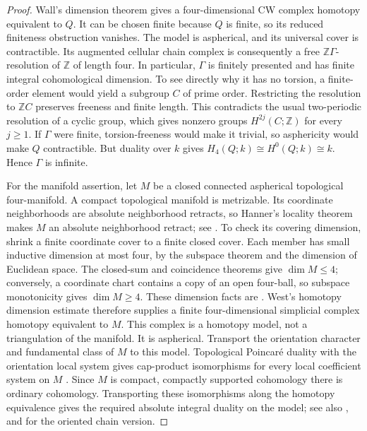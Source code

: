\begin{proof}
Wall's dimension theorem \cite[Theorem~2.2]{Wall1967} gives a
four-dimensional CW complex homotopy equivalent to $Q$. It can be
chosen finite because $Q$ is finite, so its reduced finiteness
obstruction vanishes. The model is aspherical, and its universal
cover is contractible. Its augmented cellular chain complex is
consequently a free $\mathbb Z\Gamma$-resolution of $\mathbb Z$ of
length four.
In particular, $\Gamma$ is finitely presented and has finite integral
cohomological dimension. To see directly why it has no torsion, a
finite-order element would yield a subgroup $C$ of prime order.
Restricting the resolution to $\mathbb Z C$ preserves freeness and
finite length. This contradicts the usual two-periodic resolution of
a cyclic group, which gives nonzero groups $H^{2j}(C;\mathbb Z)$ for
every $j\geq1$.
If $\Gamma$ were finite, torsion-freeness would make it trivial, so
asphericity would make $Q$ contractible. But duality over $k$ gives
$H_4(Q;k)\cong H^0(Q;k)\cong k$. Hence $\Gamma$ is infinite.

For the manifold assertion, let $M$ be a closed connected aspherical
topological four-manifold.
A compact topological manifold is metrizable. Its coordinate neighborhoods
are absolute neighborhood retracts, so Hanner's locality theorem makes
$M$ an absolute neighborhood retract; see
\cite[Theorems~3.2--3.3]{Hanner1951}.
To check its covering dimension, shrink a finite coordinate cover to a
finite closed cover. Each member has small inductive dimension at most
four, by the subspace theorem and the dimension of Euclidean space.
The closed-sum and coincidence theorems give $\dim M\le4$; conversely,
a coordinate chart contains a copy of an open four-ball, so subspace
monotonicity gives $\dim M\ge4$. These dimension facts are
\cite[Theorems~1.1.2, 1.5.3, 1.7.7 and~1.8.2]{Engelking1978}.
West's homotopy dimension estimate
\cite[Corollary~5.4]{West1977} therefore supplies a finite
four-dimensional simplicial complex homotopy equivalent to $M$.
This complex is a homotopy model, not a triangulation of the manifold.
It is aspherical. Transport the orientation character and fundamental
class of $M$ to this model. Topological Poincar\'e duality with the
orientation local system gives cap-product isomorphisms for every local
coefficient system on $M$ \cite[Theorem~1, with $R=\mathbb Z$]{Sun2017}.
Since $M$ is compact, compactly supported cohomology there is ordinary
cohomology. Transporting these isomorphisms along the homotopy equivalence
gives the required absolute integral duality on the model; see also
\cite[Theorem~10.2 and Remark~10.3]{Spanier1993}, and
\cite[Theorem~A.16]{FNOP2025} for the oriented chain version.
\end{proof}

